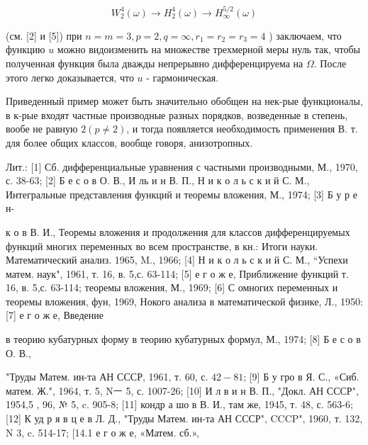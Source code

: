 \documentclass[10pt]{article}
\begin{document}
\[

W_{2}^{4}(\omega) \longrightarrow H_{2}^{4}(\omega) \longrightarrow H_{\infty}^{5 / 2}(\omega)

\]



(см. [2] и [5]) при $n=m=3, p=2, q=\infty, r_{1}=r_{2}=r_{3}=4$ ) заключаем, что функцию $u$ можно видоизменить на множестве трехмерной меры нуль так, чтобы полученная функция была дважды непрерывно дифференцируема на $\Omega$. После этого легко доказывается, что $u$ - гармоническая.



Приведенный пример может быть значительно обобщен на нек-рые функционалы, в к-рые входят частные производные разных порядков, возведенные в степень, вообе не равную $2(p \neq 2)$, и тогда появляется необходимость применения В. т. для более общих классов, вообще говоря, анизотропных.



Лит.: [1] Сб. дифференциальные уравнения с частными производными, М., 1970, с. 38-63; [2] Б е с о в О. В., И ль и н В. П., Н и к о л ь с к и й С. М., Интегральные представления функций и теоремы вложения, М., 1974; [3] Б у р е н-

к о в В. И., Теоремы вложения и продолжения для классов дифференцируемых функций многих переменных во всем пространстве, в кн.: Итоги науки. Математический анализ. 1965, M., 1966; [4] Н и к о л ь с к и й С. М., “Успехи матем. наук", 1961, т. 16, в. 5,с. 63-114; [5] е г о ж е, Приближение функций т. 16, в. 5,с. 63-114; теоремы вложения, М., 1969; [6] С омногих переменных и теоремы вложения, фун, 1969, Нокого анализа в математической физике, Л., 1950: [7] е г о ж е, Введение

в теорию кубатурных форму в теорию кубатурных формул, М., 1974; [8] Б е с о в О. В.,

"Труды Матем. ин-та АН СССР, 1961, т. 60, с. $42-81$; [9] Б у гро в Я. С., «Сиб. матем. Ж.", 1964, т. 5, Nㅡ 5, с. 1007-26; [10] И л в и н В. П., "Докл. АН СССР", 1954,5 , 96, № 5, c. 905-8; [11] кондр а шо в В. И., там же, 1945, т. 48, с. 563-6; [12] К уд р я в ц е в Л. Д., "Труды Матем. ин-та АН СССР", CCCP", 1960, т. 132, N 3, c. 514-17; [14.1 е г о ж е, «Матем. сб.»,
\end{document}
